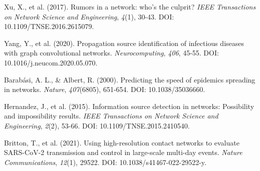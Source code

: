 \begin{thebibliography}{99}
Xu, X., et al. (2017). Rumors in a network: who’s the culprit? \textit{IEEE Transactions on Network Science and Engineering}, \textit{4}(1), 30-43. DOI: 10.1109/TNSE.2016.2615079.

Yang, Y., et al. (2020). Propagation source identification of infectious diseases with graph convolutional networks. \textit{Neurocomputing}, \textit{406}, 45-55. DOI: 10.1016/j.neucom.2020.05.070.

Barabási, A. L., \& Albert, R. (2000). Predicting the speed of epidemics spreading in networks. \textit{Nature}, \textit{407}(6805), 651-654. DOI: 10.1038/35036660.

Hernandez, J., et al. (2015). Information source detection in networks: Possibility and impossibility results. \textit{IEEE Transactions on Network Science and Engineering}, \textit{2}(2), 53-66. DOI: 10.1109/TNSE.2015.2410540.

Britton, T., et al. (2021). Using high-resolution contact networks to evaluate SARS-CoV-2 transmission and control in large-scale multi-day events. \textit{Nature Communications}, \textit{12}(1), 29522. DOI: 10.1038/s41467-022-29522-y.

\end{thebibliography}